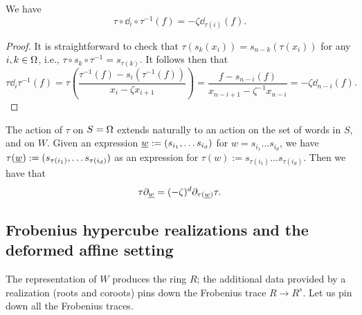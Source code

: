 \begin{lemma} We have
\begin{equation} \label{eq:reflection symmetry for reflection operator} \tau \circ \dd_i \circ \tau^{-1}(f) = - \zeta \dd_{\tau(i)}(f). \end{equation}
\end{lemma}

\begin{proof}
It is straightforward to check that $\tau(s_k(x_i))=s_{n-k}(\tau(x_i))$ for any $i, k\in \Omega$, i.e., $\tau\circ s_k\circ\tau^{-1}=s_{\tau(k)}$.
It follows then that 
\[\tau\dd_i \tau^{-1}(f)= \tau \left( \frac{\tau^{-1}(f)-s_{i}(\tau^{-1}(f))}{x_i-\zeta x_{i+1}}
\right) = \frac{f-s_{n-i}(f)}{x_{n-i+1}-\zeta^{-1}x_{n-i}}=-\zeta \dd_{n-i}(f). \] 
\end{proof}

The action of $\tau$ on $S=\Omega$ extends naturally to an action on the set of words in $S$, and on $W$. 
Given an expression $\underline{w}:=(s_{i_1}, \ldots s_{i_d})$ for $w=s_{i_1}\ldots s_{i_d}$, we have $\tau(\underline{w}):=(s_{\tau(i_1)}, \ldots s_{\tau(i_d)})$ as an expression for $\tau(w):=s_{\tau(i_1)}\ldots s_{\tau(i_d)}$. 
Then we have that 
\begin{equation}
    \tau\partial_{\underline{w}}=(-\zeta)^{d}\partial_{\tau(\underline{w})}\tau.
\end{equation}


\subsection{Frobenius hypercube realizations and the deformed affine setting}
\label{subsec-frob realizations}
\label{subsec-frob realization deformed affine}

The representation of $W$ produces the ring $R$; the additional data provided by a realization (roots and coroots) pins down the Frobenius trace $R \to R^s$. Let us pin down all the Frobenius traces.

